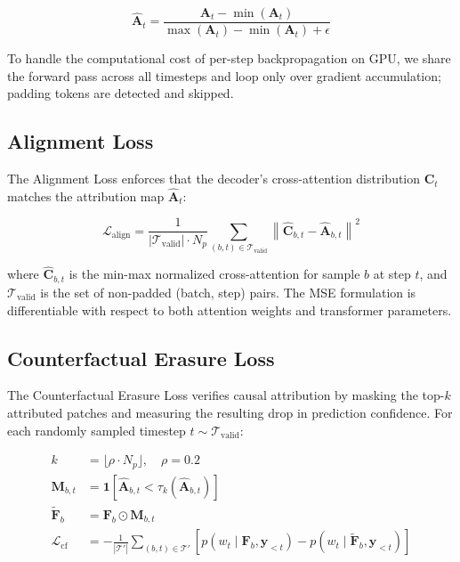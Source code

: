 \documentclass[conference]{IEEEtran}
\begin{document}
\begin{equation}
    \hat{\mathbf{A}}_t = \frac{\mathbf{A}_t - \min(\mathbf{A}_t)}{\max(\mathbf{A}_t) - \min(\mathbf{A}_t) + \epsilon}
    \label{eq:norm_attr}
\end{equation}

To handle the computational cost of per-step backpropagation on GPU, we share the forward pass across all timesteps and loop only over gradient accumulation; padding tokens are detected and skipped.

\subsection{Alignment Loss}

The Alignment Loss enforces that the decoder's cross-attention distribution $\mathbf{C}_t$ matches the attribution map $\hat{\mathbf{A}}_t$:

\begin{equation}
    \mathcal{L}_{\text{align}} = \frac{1}{|\mathcal{T}_{\text{valid}}| \cdot N_p} \sum_{(b,t) \in \mathcal{T}_{\text{valid}}} \left\|\hat{\mathbf{C}}_{b,t} - \hat{\mathbf{A}}_{b,t}\right\|^2
    \label{eq:align}
\end{equation}

where $\hat{\mathbf{C}}_{b,t}$ is the min-max normalized cross-attention for sample $b$ at step $t$, and $\mathcal{T}_{\text{valid}}$ is the set of non-padded (batch, step) pairs. The MSE formulation is differentiable with respect to both attention weights and transformer parameters.

\subsection{Counterfactual Erasure Loss}

The Counterfactual Erasure Loss verifies causal attribution by masking the top-$k$ attributed patches and measuring the resulting drop in prediction confidence. For each randomly sampled timestep $t \sim \mathcal{T}_{\text{valid}}$:

\begin{align}
    k &= \lfloor \rho \cdot N_p \rfloor, \quad \rho = 0.2 \label{eq:k}\\
    \mathbf{M}_{b,t} &= \mathbf{1}\left[\hat{\mathbf{A}}_{b,t} < \tau_k(\hat{\mathbf{A}}_{b,t})\right] \label{eq:mask}\\
    \tilde{\mathbf{F}}_{b} &= \mathbf{F}_b \odot \mathbf{M}_{b,t} \label{eq:masked_feat}\\
    \mathcal{L}_{\text{cf}} &= -\frac{1}{|\mathcal{T}'|} \sum_{(b,t) \in \mathcal{T}'} \left[p(w_t \mid \mathbf{F}_b, \mathbf{y}_{<t}) - p(w_t \mid \tilde{\mathbf{F}}_b, \mathbf{y}_{<t})\right]
    \label{eq:cf}
\end{align}
\end{document}
